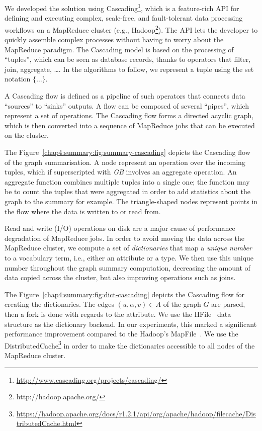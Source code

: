 We developed the solution using Cascading\footnote{\url{http://www.cascading.org/projects/cascading/}}, which is a feature-rich API for defining and executing complex, scale-free, and fault-tolerant data processing workflows on a MapReduce cluster (e.g., Hadoop\footnote{http://hadoop.apache.org/}). The API lets the developer to quickly assemble complex processes without having to worry about the MapReduce paradigm. The Cascading model is based on the processing of ``tuples'', which can be seen as database records, thanks to operators that filter, join, aggregate, \ldots.  In the algorithms to follow, we represent a tuple using the set notation $\{\ldots\}$.

A Cascading flow is defined as a pipeline of such operators that connects data ``sources'' to ``sinks'' outputs. A flow can be composed of several ``pipes'', which represent a set of operations. The Cascading flow forms a directed acyclic graph, which is then converted into a sequence of MapReduce jobs that can be executed on the cluster.

The Figure~\ref{chap4:summary:fig:summary-cascading} depicts the Cascading flow of the graph summarisation. A node represent an operation over the incoming tuples, which if superscripted with \emph{GB} involves an aggregate operation. An aggregate function combines multiple tuples into a single one; the function may be to count the tuples that were aggregated in order to add statistics about the graph to the summary for example. The triangle-shaped nodes represent points in the flow where the data is written to or read from.


Read and write (I/O) operations on disk are a major cause of performance degradation of MapReduce jobs. In order to avoid moving the data across the MapReduce cluster, we compute a set of \emph{dictionaries} that map a \emph{unique number} to a vocabulary term, i.e., either an attribute or a type. We then use this unique number throughout the graph summary computation, decreasing the amount of data copied across the cluster, but also improving operations such as joins.

The Figure~\ref{chap4:summary:fig:dict-cascading} depicts the Cascading flow for creating the dictionaries. The edges $(u, \alpha, v) \in A$ of the graph $G$ are parsed, then a fork is done with regards to the attribute. We use the HFile~\cite{hfile} data structure as the dictionary backend. In our experiments, this marked a significant performance improvement compared to the Hadoop's MapFile~\cite{mapfile}. We use the DistributedCache\footnote{\url{https://hadoop.apache.org/docs/r1.2.1/api/org/apache/hadoop/filecache/DistributedCache.html}} in order to make the dictionaries accessible to all nodes of the MapReduce cluster.


